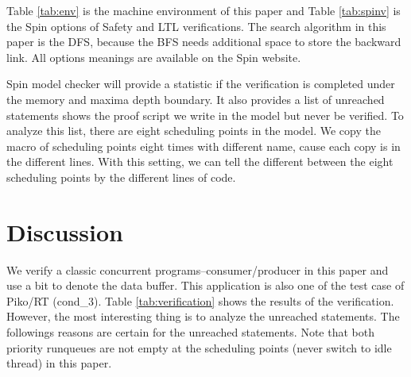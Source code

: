 Table \ref{tab:env} is the machine environment of this paper and Table \ref{tab:spinv} is the Spin options of Safety and LTL verifications. The search algorithm in this paper is the DFS, because the BFS needs additional space to store the backward link. All options meanings are available on the Spin website.

Spin model checker will provide a statistic if the verification is completed under the memory and maxima depth boundary. It also provides a list of unreached statements shows the proof script we write in the model but never be verified. To analyze this list, there are eight scheduling points in the model. We copy the macro of scheduling points eight times with different name, cause each copy is in the different lines. With this setting, we can tell the different between the eight scheduling points by the different lines of code.

\section{Discussion}
We verify a classic concurrent programs--consumer/producer in this paper and use a bit to denote the data buffer. This application is also one of the test case of Piko/RT (cond\_3). Table \ref{tab:verification} shows the results of the verification. However, the most interesting thing is to analyze the unreached statements. The followings reasons are certain for the unreached statements. Note that both priority runqueues are not empty at the scheduling points (never switch to idle thread) in this paper.

